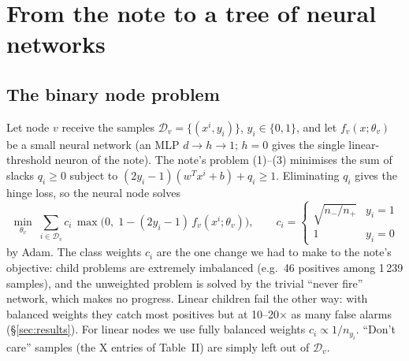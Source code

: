 \section{From the note to a tree of neural networks}
\label{sec:method}

\subsection{The binary node problem}
Let node $v$ receive the samples $\mathcal{D}_v=\{(x^i,y_i)\}$, $y_i\in\{0,1\}$, and let
$f_v(x;\theta_v)$ be a small neural network (an MLP $d\!\to\!h\!\to\!1$; $h=0$ gives the single
linear-threshold neuron of the note). The note's problem (1)--(3) minimises the sum of slacks
$q_i\ge 0$ subject to $(2y_i-1)(w^Tx^i+b)+q_i\ge 1$. Eliminating $q_i$ gives the hinge loss, so the
neural node solves
\begin{equation}
  \min_{\theta_v}\; \sum_{i\in\mathcal{D}_v} c_i\, \max\bigl(0,\;1-(2y_i-1)\,f_v(x^i;\theta_v)\bigr),
  \qquad c_i=\begin{cases} \sqrt{n_-/n_+} & y_i=1\\ 1 & y_i=0\end{cases}
  \label{eq:node}
\end{equation}
by Adam. The class weights $c_i$ are the one change we had to make to the note's objective:
child problems are extremely imbalanced (e.g.\ 46 positives among 1\,239 samples), and the unweighted
problem is solved by the trivial ``never fire'' network, which makes no progress. Linear children
fail the other way: with balanced weights they catch most positives but at 10--20$\times$ as many
false alarms (\S\ref{sec:results}). For linear nodes we use fully balanced
weights $c_i\propto 1/n_{y_i}$. ``Don't care'' samples (the X entries of Table~II) are simply left
out of $\mathcal{D}_v$.

